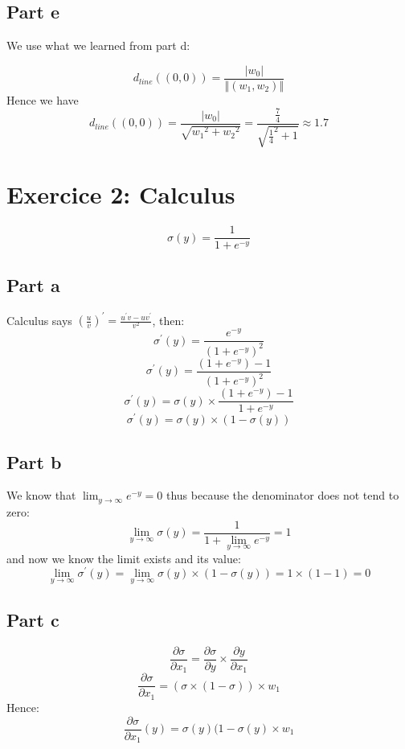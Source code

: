 \documentclass[a4paper, 10pt]{article}
\begin{document}
\subsection{Part e}
We use what we learned from part d:

$$
d_{line}((0, 0)) = \frac{\left\vert w_0\right\vert}{\left\Vert(w_1, w_2)\right\Vert}
$$
Hence we have
$$
d_{line}((0, 0)) = \frac{\left\vert w_0\right\vert}{\sqrt{{w_1}^2 + {w_2}^2}} = \frac{\frac{7}{4}}{\sqrt{{\frac{1}{4}}^2+1}} \approx 1.7
$$

\section{Exercice 2: Calculus}
$$
\sigma(y) = \frac{1}{1+e^{-y}}
$$
\subsection{Part a}
Calculus says $\left(\frac{u}{v}\right)^{\prime} = \frac{u^{\prime}v - uv^{\prime}}{v^2}$, then:
$$
\sigma^{\prime}(y) = \frac{e^{-y}}{\left(1+e^{-y}\right)^2}
$$
$$
\sigma^{\prime}(y) = \frac{(1 + e^{-y}) - 1}{\left(1+e^{-y}\right)^2}
$$
$$
\sigma^{\prime}(y) = \sigma(y) \times \frac{(1 + e^{-y}) - 1}{1+e^{-y}}
$$
$$
\sigma^{\prime}(y) = \sigma(y) \times (1 - \sigma(y))
$$

\subsection{Part b}
We know that $\lim_{y\to\infty} e^{-y} = 0$ thus because the denominator does not tend to zero:
$$
\lim_{y\to\infty} \sigma(y) = \frac{1}{1+\lim_{y\to\infty}e^{-y}} = 1
$$
and now we know the limit exists and its value:
$$
\lim_{y\to\infty}\sigma^{\prime}(y) = \lim_{y\to\infty} \sigma(y) \times (1-\sigma(y)) = 1 \times (1-1) = 0
$$

\subsection{Part c}
$$
\frac{\partial\sigma}{\partial x_1} = \frac{\partial\sigma}{\partial y} \times \frac{\partial y}{\partial x_1}
$$
$$
\frac{\partial\sigma}{\partial x_1} = \left(\sigma \times (1 - \sigma)\right) \times w_1
$$
Hence:
$$
\frac{\partial\sigma}{\partial x_1}(y) = \sigma(y) (1-\sigma(y) \times w_1
$$
\end{document}
